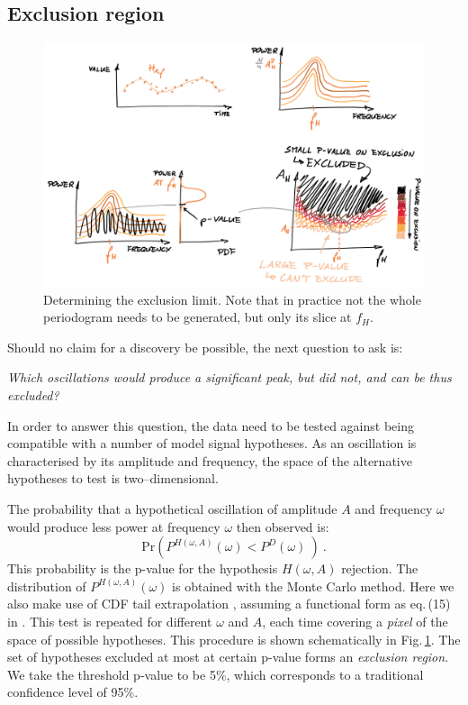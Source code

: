 \subsection{Exclusion region}
\begin{figure}[htb]
  \centering \includegraphics[width=\linewidth]{gfx/axions/exclusion_region.png}
  \caption{Determining the exclusion limit. Note that in practice not the whole periodogram needs to be generated, but only its slice at $f_H$.}
  \label{fig:exclusion_region}
\end{figure}

Should no claim for a discovery be possible, the next question to ask is:
\begin{center}
  \emph{Which oscillations would produce a significant peak, but did not, and can be thus excluded?}
\end{center}
In order to answer this question, the data need to be tested against being compatible with a number of model signal hypotheses. As an oscillation is characterised by its amplitude and frequency, the space of the alternative hypotheses to test is two--dimensional.

The probability that a hypothetical oscillation of amplitude $A$ and frequency $\omega$ would produce less power at frequency $\omega$ then observed is:
\begin{equation}
  \mathrm{Pr}\left( P^{H(\omega, A)}(\omega) < P^D(\omega)\ \right) \ .
\end{equation}
This probability is the p-value for the hypothesis $H(\omega, A)$ rejection. The distribution of $P^{H(\omega, A)}(\omega)$ is obtained with the Monte Carlo method. Here we also make use of CDF tail extrapolation , assuming a functional form as eq.\,(15) in \cite{Scargle1982} . This test is repeated for different $\omega$ and $A$, each time covering a \emph{pixel} of the space of possible hypotheses. This procedure is shown schematically in Fig.\,\ref{fig:exclusion_region}. The set of hypotheses excluded at most at certain p-value forms an \emph{exclusion region}. We take the threshold p-value to be 5\%, which corresponds to a traditional confidence level of 95\%.

